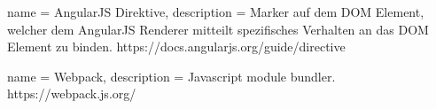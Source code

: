 {
  name = AngularJS Direktive,
  description = { Marker auf dem DOM Element, welcher dem AngularJS Renderer mitteilt spezifisches Verhalten an das DOM Element zu binden. https://docs.angularjs.org/guide/directive }
}

{
  name = Webpack,
  description = { Javascript module bundler.  https://webpack.js.org/ }
}
